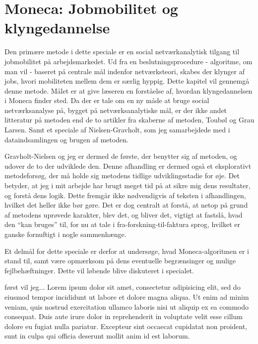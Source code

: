 



\chapter{Moneca: Jobmobilitet og klyngedannelse \label{kap metode_sna}}

Den primære metode i dette speciale er en social netværkanalytisk tilgang til jobmobilitet på arbejdsmarkedet. Ud fra en beslutningsprocedure - algoritme, om man vil - baseret på centrale mål indenfor netværksteori, skabes der klynger af jobs, hvori mobiliteten mellem dem er særlig hyppig. Dette kapitel vil gennemgå denne metode. Målet er at give læseren en forståelse af, hvordan klyngedannelsen i Moneca finder sted. Da der er tale om en ny måde at bruge social netværksanalyse på, bygget på netværksanalytiske mål, er der ikke andet litteratur på metoden end de to artikler fra skaberne af metoden, Toubøl og Grau Larsen. Samt et speciale af Nielsen-Gravholt, som jeg samarbejdede med i dataindsamlingen og brugen af metoden. 


Gravholt-Nielsen og jeg er dermed de første, der benytter sig af metoden, og udover de to der udviklede den. Denne afhandling er dermed også et eksplorativt metodeforsøg, der må holde sig metodens tidlige udviklingsstadie for øje. Det betyder, at jeg i mit arbejde har brugt meget tid på at sikre mig dens resultater, og forstå dens logik. Dette fremgår ikke nødvendigvis af teksten i afhandlingen, hvilket det heller ikke bør gøre. Det er dog centralt at forstå, at netop på grund af metodens uprøvede karakter, blev det, og bliver det, vigtigt at fastslå, hvad den “kan bruges” til, for nu at tale i fra-forskning-til-faktura sprog, hvilket er ganske fornuftigt i nogle sammenhænge.

Et delmål for dette speciale er derfor at undersøge, hvad Moneca-algoritmen er i stand til, samt være opmærksom på dens eventuelle begrænsinger og mulige fejlbehæftninger. Dette vil løbende blive diskuteret i specialet.

først vil jeg... Lorem ipsum dolor sit amet, consectetur adipisicing elit, sed do eiusmod
tempor incididunt ut labore et dolore magna aliqua. Ut enim ad minim veniam,
quis nostrud exercitation ullamco laboris nisi ut aliquip ex ea commodo
consequat. Duis aute irure dolor in reprehenderit in voluptate velit esse
cillum dolore eu fugiat nulla pariatur. Excepteur sint occaecat cupidatat non
proident, sunt in culpa qui officia deserunt mollit anim id est laborum.

